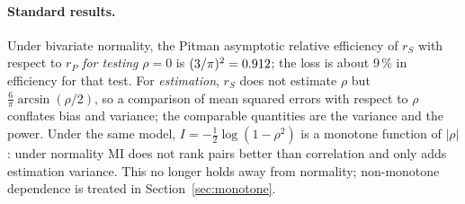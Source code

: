 \documentclass[11pt,a4paper]{article}
\theoremstyle{plain}
\theoremstyle{remark}
\newcommand{\MI}{I}
\begin{document}
\paragraph{Standard results.} Under bivariate normality, the Pitman asymptotic relative efficiency of
$r_S$ with respect to $r_P$ \emph{for testing} $\rho=0$ is $(3/\pi)^2=0.912$;
the loss is about 9\,\% in efficiency for that test. For \emph{estimation}, $r_S$ does not
estimate $\rho$ but $\tfrac{6}{\pi}\arcsin(\rho/2)$, so a comparison of mean squared errors
with respect to $\rho$ conflates bias and variance; the comparable quantities are the variance
and the power. Under the same model, $\MI=-\tfrac12\log(1-\rho^2)$ is a monotone function of
$|\rho|$: under normality MI does not rank pairs better than correlation and only adds
estimation variance. This no longer holds away from normality; non-monotone dependence is
treated in Section~\ref{sec:monotone}.
\end{document}
